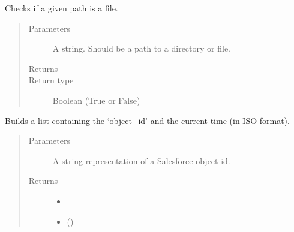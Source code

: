 \documentclass[letterpaper,10pt,english]{sphinxmanual}
\begin{document}

\begin{fulllineitems}
\label{\detokenize{index:ListManagement.utility.general.is_path}}
Checks if a given path is a file.
\begin{quote}\begin{description}
\item[{Parameters}] \leavevmode
{} \textendash{} A string. Should be a path to a directory or file.

\item[{Returns}] \leavevmode


\item[{Return type}] \leavevmode
Boolean (True or False)

\end{description}\end{quote}

\end{fulllineitems}


\begin{fulllineitems}
\label{\detokenize{index:ListManagement.utility.general.last_list_uploaded_data}}
Builds a list containing the ‘object\_id’ and the current time (in ISO-format).
\begin{quote}\begin{description}
\item[{Parameters}] \leavevmode
{} \textendash{} A string representation of a Salesforce object id.

\item[{Returns}] \leavevmode
\begin{itemize}
\item {} 

\item {} 
 ()

\end{itemize}


\end{description}\end{quote}

\end{fulllineitems}
\end{document}
